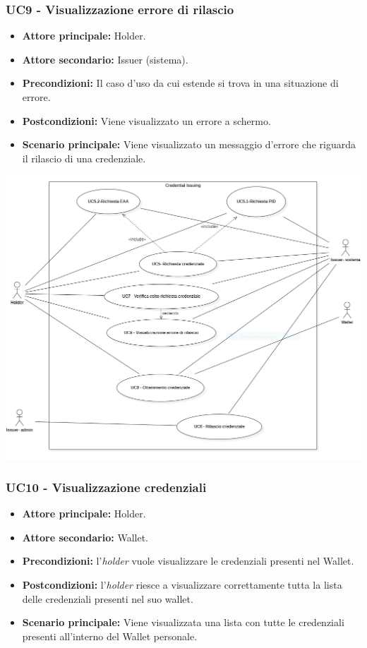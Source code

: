 \subsubsection{UC9 - Visualizzazione errore di rilascio}
\begin{itemize}
    \item \textbf{Attore principale:} Holder.
    \item  \textbf{Attore secondario:} Issuer (sistema).
    \item \textbf{Precondizioni:} Il caso d'uso da cui estende si trova in una situazione di errore.
    \item \textbf{Postcondizioni:} Viene visualizzato un errore a schermo. 
    \item \textbf{Scenario principale:} Viene visualizzato un messaggio d’errore che riguarda il rilascio di una credenziale.
\end{itemize}

\begin{center}
    \includegraphics[scale = 0.65]{./res/img/UC2.PNG}
\end{center}

\subsubsection{UC10 - Visualizzazione credenziali}
\begin{itemize}
    \item \textbf{Attore principale:} Holder.
    \item \textbf{Attore secondario:} Wallet.
    \item \textbf{Precondizioni:} l'\textit{holder} vuole visualizzare le credenziali presenti nel Wallet. 
    \item \textbf{Postcondizioni:} l'\textit{holder} riesce a visualizzare correttamente tutta la lista delle credenziali presenti nel suo wallet. 
    \item \textbf{Scenario principale:} Viene visualizzata una lista con tutte le credenziali presenti all'interno del Wallet personale. 
\end{itemize}


